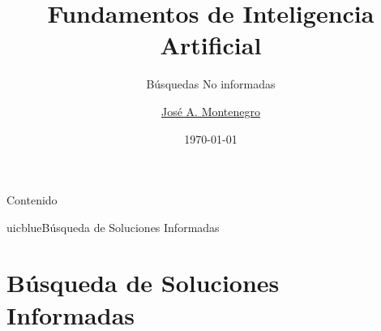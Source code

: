 \documentclass[xcolor=table]{beamer}
\title{Fundamentos de Inteligencia Artificial}
\subtitle{Búsquedas No informadas}
\author{\href{mailto:jmmontes@uma.es}{José A. Montenegro}}
\date{\today}
\begin{document}
\newtheorem{mydef}{Definición}[section] %
\maketitle






\begin{frame}{Contenido}
\tableofcontents
\end{frame}


\begin{chapter}{uicblue}{Búsqueda de Soluciones Informadas}
\end{chapter}

\section{Búsqueda de Soluciones Informadas}



\end{document}
